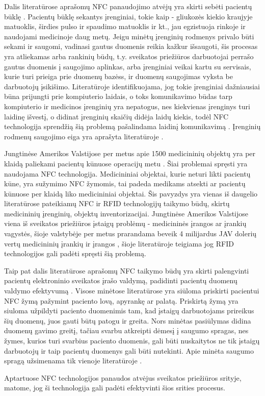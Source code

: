 Dalis literatūrose aprašomų NFC panaudojimo atvėjų yra skirti sebėti pacientų būklę \cite{Strommer2006} \cite{Gautam} \cite{Zhang2011}. Pacientų būklę sekantys įrenginiai, tokie kaip - gliukozės kiekio kraujyje matuoklis, širdies pulso ir spaudimo matuoklis ir kt., jau egzistuoja rinkoje ir naudojami medicinoje daug metų. Jeigu minėtų įrenginių rodmenys privalo būti sekami ir saugomi, vadinasi gautus duomenis reikia kažkur išsaugoti, šis procesas yra atliekamas arba rankinių būdų, t.y. sveikatos priežiūros darbuotojai perrašo gautus duomenis į saugojimo aplinkas, arba įrenginiai veikai kartu su servisais, kurie turi prieiga prie duomenų bazėss, ir duomenų saugojimas vyksta be darbuotojų įsikišimo. Literatūroje \cite{Strommer2006} identifikuojama, jog tokie įrenginiai dažniausiai būna prijungti prie kompiuterio laidais, o toks komunikavimo būdas tarp kompiuterio ir medicinos įrenginių yra nepatogus, nes kiekvienas įrenginys turi laidinę išvestį, o didinat įrenginių skaičių didėja laidų kiekis, todėl NFC technologija sprendžią šią problemą pašalindama laidinį komunikavimą \cite{Strommer2006}. Įrenginių rodmenų saugojimo eiga yra aprašyta literatūroje \cite{Zhang2011}.

Jungtinėse Amerikos Valstijose per metus apie 1500 medicininių objektų yra per klaidą paliekami pacientų kūnuose operacijų metu \cite{RamaKrishnaPrasad}. Šiai problemai spręsti yra naudojama NFC technologija. Medicininiai objektai, kurie neturi likti pacientų kūne, yra sužymimo NFC žymomis, tai padeda medikams atsekti ar pacientų kūnuose per klaidą liko medicininiai objektai. Šis pavyzdys yra vienas iš daugelio literatūrose \cite{Ajami2014} \cite{Puma2012} \cite{Azlina2013} pateikiamų NFC ir RFID technologijų taikymo būdų, skirtų medicininių įrenginių, objektų inventorizacijai. Jungtinėse Amerikos Valstijose viena iš sveikatos priežiūros įstaigų problėmų - medicininės įrangos ar įrankių vagystės, šioje valstybėje per metus prarandama beveik 4 milijardus JAV dolerių vertų medicininių įrankių ir įrangos \cite{RamaKrishnaPrasad}, šioje literatūroje teigiama jog RFID technologijos gali padėti spręsti šią problemą.

Taip pat dalis literatūrose aprašomų NFC taikymo būdų yra skirti palengvinti pacientų elektroninio sveikatos įrašo valdymą, padidinti pacientų duomenų valdymo efektyvumą \cite{Gautam} \cite{RamaKrishnaPrasad} \cite{Fontecha2011} \cite{Davcev2015}. Visose minėtose literatūrose yra siūloma priskirti pacientui NFC žymą pažymint paciento lovą, apyrankę ar palatą. Priskirtą žymą yra siuloma užpildyti paciento duomenimis tam, kad įstaigų darbuotojams prireikus šių duomenų, juos gauti būtų patogu ir greita. Nors minėtas pasiūlymas didina duomenų gavimo greitį, tačiau svarbu atkreipti dėmesį į saugumo spragas, nes žymes, kurios turi svarbius paciento duomenis, gali būti nuskaitytos ne tik įstaigų darbuotojų ir taip pacientų duomenys gali būti nutekinti. Apie minėta saugumo spragą užsimenama tik vienoje literatūroje \cite{RamaKrishnaPrasad}.

Aptartuose NFC technologijos panaudos atvėjus sveikatos priežiūros srityje, matome, jog ši technologija gali padėti efektyvinti šios srities procesus.


